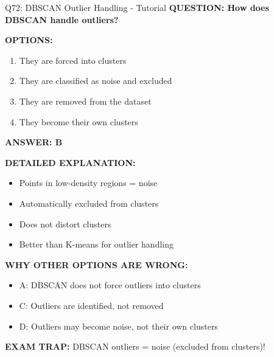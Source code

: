 \documentclass[8pt]{beamer}
\begin{document}
	\begin{frame}{Q72: DBSCAN Outlier Handling - Tutorial}
		\fontsize{6.5}{7.5}\selectfont
		\textbf{QUESTION: How does DBSCAN handle outliers?}
		
		\vspace{0.1cm}
		\textbf{OPTIONS:}
		\begin{enumerate}
			\item They are forced into clusters
			\item They are classified as noise and excluded
			\item They are removed from the dataset
			\item They become their own clusters
		\end{enumerate}
		
		\vspace{0.1cm}
		\textcolor{myblue}{\textbf{ANSWER: B}}
		
		\vspace{0.1cm}
		\textbf{DETAILED EXPLANATION:}
		\begin{itemize}
			\item Points in low-density regions = noise
			\item Automatically excluded from clusters
			\item Does not distort clusters
			\item Better than K-means for outlier handling
		\end{itemize}
		
		\vspace{0.1cm}
		\textcolor{myred}{\textbf{WHY OTHER OPTIONS ARE WRONG:}}
		\begin{itemize}
			\item \textcolor{myred}{A:} DBSCAN does not force outliers into clusters
			\item \textcolor{myred}{C:} Outliers are identified, not removed
			\item \textcolor{myred}{D:} Outliers may become noise, not their own clusters
		\end{itemize}
		
		\textcolor{myred}{\textbf{EXAM TRAP:}} DBSCAN outliers = \textcolor{myblue}{noise} (excluded from clusters)!
	\end{frame}
	
\end{document}
